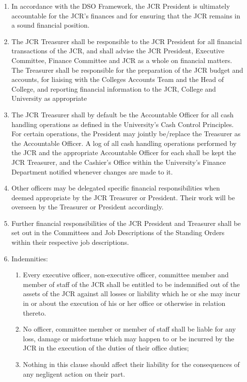 \begin{enumerate}
    \item In accordance with the DSO Framework, the JCR President is ultimately accountable for the JCR’s finances and for ensuring that the JCR remains in a sound financial position.
    \item  The JCR Treasurer shall be responsible to the JCR President for all financial transactions of the JCR, and shall advise the JCR President, Executive Committee, Finance Committee and JCR as a whole on financial matters. The Treasurer shall be responsible for the preparation of the JCR budget and accounts, for liaising with the Colleges Accounts Team and the Head of College, and reporting financial information to the JCR, College and University as appropriate
    \item  The JCR Treasurer shall by default be the Accountable Officer for all cash handling operations as defined in the University’s Cash Control Principles. For certain operations, the President may jointly be/replace the Treasurer as the Accountable Officer. A log of all cash handling operations performed by the JCR and the appropriate Accountable Officer for each shall be kept the JCR Treasurer, and the Cashier’s Office within the University’s Finance Department notified whenever changes are made to it.
    \item Other officers may be delegated specific financial responsibilities when deemed appropriate by the JCR Treasurer or President. Their work will be overseen by the Treasurer or President accordingly.
    \item  Further financial responsibilities of the JCR President and Treasurer shall be set out in the Committees and Job Descriptions of the Standing Orders within their respective job descriptions.
    \item Indemnities:
    \begin{enumerate}
        \item Every executive officer, non-executive officer, committee member and member of staff of the JCR shall be entitled to be indemnified out of the assets of the JCR against all losses or liability which he or she may incur in or about the execution of his or her office or otherwise in relation thereto.
        \item  No officer, committee member or member of staff shall be liable for any loss, damage or misfortune which may happen to or be incurred by the JCR in the execution of the duties of their office duties;
        \item  Nothing in this clause should affect their liability for the consequences of any negligent action on their part.
    \end{enumerate}
\end{enumerate}

